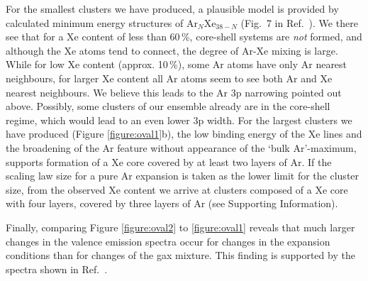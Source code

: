 For the smallest clusters we have produced, a plausible model is provided by calculated minimum energy structures of Ar$_N$Xe$_{38-N}$ (Fig.\ 7 in Ref.\ ).
We there see that for a Xe content of less than 60\,\%, core-shell systems are {\it not} formed, and although the Xe atoms tend to connect, the degree of Ar-Xe mixing is large.
While for low Xe content (approx. 10\,\%), some Ar atoms have only Ar nearest neighbours, for larger Xe content all Ar atoms seem to see both Ar and Xe nearest neighbours.
We believe this leads to the Ar 3p narrowing pointed out above.
Possibly, some clusters of our ensemble already are in the core-shell regime, which would lead to an even lower 3p width.
For the largest clusters we have produced (Figure \ref{figure:oval1}b), the low binding energy of the Xe lines and the broadening of the Ar feature without appearance of the `bulk Ar'-maximum, supports formation of a Xe core covered by at least two layers of Ar.
If the scaling law size for a pure Ar expansion is taken as the lower limit for the cluster size, from the observed Xe content we arrive at clusters composed of a Xe core with four layers, covered by three layers of Ar (see Supporting Information).

Finally, comparing Figure \ref{figure:oval2} to \ref{figure:oval1} reveals that much larger changes in the valence emission spectra occur for changes in the expansion conditions than for changes of the gax mixture.
This finding is supported by the spectra shown in Ref.\ .
%
%
